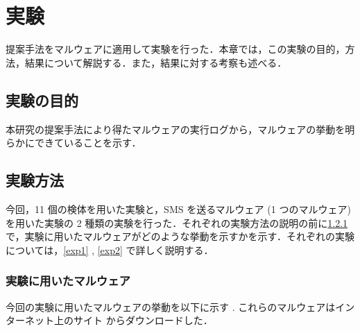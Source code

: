 \section{実験}
\label{sec:exp}
提案手法をマルウェアに適用して実験を行った．本章では，この実験の目的，方法，結果について解説する．また，結果に対する考察も述べる．
\subsection{実験の目的}
本研究の提案手法により得たマルウェアの実行ログから，マルウェアの挙動を明らかにできていることを示す．

\subsection{実験方法}
今回，11 個の検体を用いた実験と，SMS を送るマルウェア (1 つのマルウェア)を用いた実験の 2 種類の実験を行った．それぞれの実験方法の説明の前に\ref{expmalware} で，実験に用いたマルウェアがどのような挙動を示すかを示す．それぞれの実験については，\ref{exp1} , \ref{exp2} で詳しく説明する．

\subsubsection{実験に用いたマルウェア}
\label{expmalware}
今回の実験に用いたマルウェアの挙動を以下に示す \cite{golddream} \cite{basebridge} \cite{droiddreamlight} \cite{crazyapp} \cite{icalendar} \cite{snake} \cite{trojan} . これらのマルウェアはインターネット上のサイト \cite{malwaresite} からダウンロードした．

